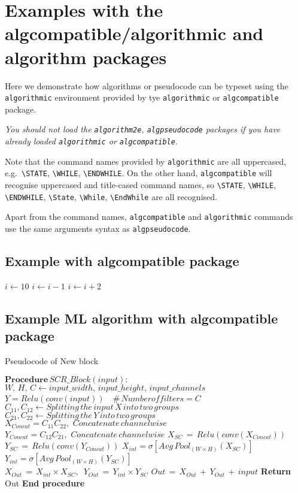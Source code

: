 \documentclass[11pt]{article}
\begin{document}
\section{Examples with the algcompatible/algorithmic and algorithm packages}

Here we demonstrate how algorithms or pseudocode can be typeset using the \verb|algorithmic| environment provided by tye \verb|algorithmic| or \verb|algcompatible| package.

{\itshape You should not load the \verb|algorithm2e|, \verb|algpseudocode| packages if you have already loaded \verb|algorithmic| or \verb|algcompatible|.} 

Note that the command names provided by \verb|algorithmic| are all uppercased, e.g.~\verb|\STATE|, \verb|\WHILE|, \verb|\ENDWHILE|. On the other hand, \verb|algcompatible| will recognise uppercased and title-cased command names, so \verb|\STATE|, \verb|\WHILE|, \verb|\ENDWHILE|, \verb|\State|, \verb|\While|, \verb|\EndWhile| are all recognised. 

Apart from the command names, \verb|algcompatible| and \verb|algorithmic| commands use the same arguments syntax as \verb|algpseudocode|.

\subsection{ Example with  algcompatible package }
\begin{algorithmic}
\STATE $i\gets 10$
        \STATE $i\gets i-1$
\ELSE
                \STATE $i\gets i+2$
        \ENDIF
\ENDIF 
\end{algorithmic}


\subsection{ Example ML algorithm with  algcompatible package }


\begin{algorithm}
\caption{Pseudocode of New block}
\begin{algorithmic}[1]
\STATE $\textbf{Procedure}\,SCR\_Block(input):$
\STATE $W,\,H,\,C\leftarrow input\_width,\,input\_height,\,input\_channels$
\STATE $Y = Relu(conv(input))$ \,\,\,\,\#\,$Number of filters = C$
\STATE $C_{11},C_{12}\leftarrow Splitting\,the\,input\,X \,into\,two\,groups$
\STATE $C_{21},C_{22}\leftarrow Splitting\,the\,Y\,into\,two\,groups$
\STATE $X_{Concat}=C_{11}C_{22},\,\,Concatenate\,channelwise$
\STATE $Y_{Concat}=C_{12}C_{21},\,\,Concatenate\,channelwise$
\STATE $X_{SC}\,=\,Relu(conv(X_{Concat}))$
\STATE $Y_{SC}\,=\,Relu(conv(Y_{Concat}))$
\STATE $X_{int}=\sigma \left [Avg\,Pool_{(W \times H)}(X_{SC})\right ]$\\
\STATE $Y_{int}=\sigma \left [Avg\,Pool_{(W\times H)}(Y_{SC})\right ]$\\
\STATE $X_{Out}\,=\,X_{int}\times X_{SC},\,\,\,Y_{Out}\,=\,Y_{int}\times Y_{SC}$
\STATE $Out\,=\,X_{Out}\,+\,Y_{Out}\,+\,input$
\STATE \textbf{Return} Out
\STATE \textbf{End procedure}
\end{algorithmic}
\end{algorithm}
\end{document}
